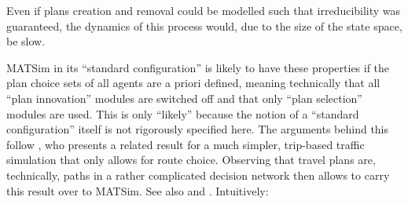 \begin{itemize}
Even if plans creation and removal could be modelled such that irreducibility was guaranteed, the dynamics of this process would, due to the size of the state space, be slow.



\end{itemize}

MATSim in its {}``standard configuration'' is likely to have
these properties if the plan choice sets of all agents are a priori
defined, meaning technically that all {}``plan innovation'' modules
are switched off and that only {}``plan selection'' modules are
used. This is only {}``likely'' because the notion of a {}``standard
configuration'' itself is not rigorously specified here. The arguments
behind this follow \citet{cascetta-1989}, who presents a related
result for a much simpler, trip-based traffic simulation that only
allows for route choice. Observing that travel plans are, technically,
paths in a rather complicated decision network then allows to carry
this result over to MATSim. See also \citet{NagelEtc2000tristan-succ} and \citep{floetteroed-2010e}.
%
%
Intuitively:
